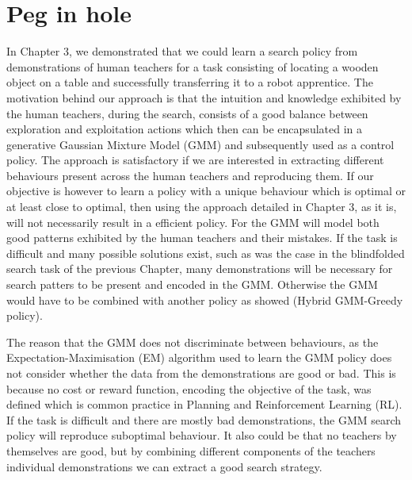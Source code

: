 \chapter{Peg in hole}

In Chapter 3, we demonstrated that we could learn a search policy from demonstrations of human teachers for a task consisting of 
locating a wooden object on a table and successfully transferring it to a robot apprentice. The motivation behind our approach is 
that the intuition and knowledge exhibited by the human teachers, during the search, consists of a good balance between 
exploration and exploitation actions which then can be encapsulated in a generative Gaussian Mixture Model (GMM) and subsequently used as a control policy. 
The approach is satisfactory if we are interested in extracting different behaviours present across the human teachers and reproducing 
them. If our objective is however to learn a policy with a unique behaviour which is optimal or at least close to optimal, then using  
the approach detailed in Chapter 3, as it is, will not necessarily result in a efficient policy. For the GMM will model
both good patterns exhibited by the human teachers and their mistakes. If the task is difficult and many possible solutions exist, such 
as was the case in the blindfolded search task of the previous Chapter, many demonstrations will be necessary for search patters to be 
present and encoded in the GMM. Otherwise the GMM would have to be combined with another policy as showed (Hybrid GMM-Greedy 
policy). 


The reason that the GMM does not discriminate between behaviours, as the Expectation-Maximisation (EM) algorithm used to 
learn the GMM policy does not consider whether the data from the demonstrations are good or bad. This is because no cost or 
reward function, encoding the objective of the task, was defined which is common practice in Planning and Reinforcement Learning (RL). 
If the task is difficult and there are mostly bad demonstrations, the GMM search policy will reproduce suboptimal behaviour. 
It also could be that no teachers by themselves are good, but by combining different components of 
the teachers individual demonstrations we can extract a good search strategy.


